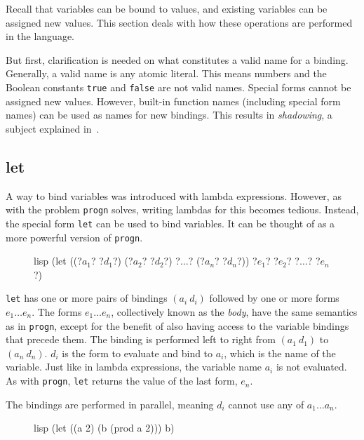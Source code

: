 Recall that variables can be bound to values, and existing variables can be assigned new values. This section deals with how these operations are performed in the language.

But first, clarification is needed on what constitutes a valid name for a binding. Generally, a valid name is any atomic literal. This means numbers and the Boolean constants \texttt{true} and \texttt{false} are not valid names. Special forms cannot be assigned new values. However, built-in function names (including special form names) can be used as names for new bindings. This results in \textit{shadowing}, a subject explained in~.

\subsection{let}
A way to bind variables was introduced with lambda expressions. However, as with the problem \texttt{progn} solves, writing lambdas for this becomes tedious. Instead, the special form \texttt{let} can be used to bind variables. It can be thought of as a more powerful version of \texttt{progn}.

\begin{figure}[htp]
    \centering
    \begin{cminted}[autogobble=true, escapeinside=??]{lisp}
        (let ((?$a_1$? ?$d_1$?) (?$a_2$? ?$d_2$?) ?$\ldots$? (?$a_n$? ?$d_n$?)) ?$e_1$? ?$e_2$? ?$\ldots$? ?$e_n$?)
    \end{cminted}
    \captionsetup[figure]{font=small}
\end{figure}

\texttt{let} has one or more pairs of bindings $(a_i\ d_i)$ followed by one or more forms $e_1 \ldots e_n$. The forms $e_1 \ldots e_n$, collectively known as the \textit{body}, have the same semantics as in \texttt{progn}, except for the benefit of also having access to the variable bindings that precede them. The binding is performed left to right from $(a_1\ d_1)$ to $(a_n\ d_n)$. $d_i$ is the form to evaluate and bind to $a_i$, which is the name of the variable. Just like in lambda expressions, the variable name $a_i$ is not evaluated. As with \texttt{progn}, \texttt{let} returns the value of the last form, $e_n$.

The bindings are performed in parallel, meaning $d_i$ cannot use any of $a_1 \ldots a_n$.

\begin{figure}[htp]
    \centering
    \begin{cminted}[autogobble=true]{lisp}
        (let ((a 2) (b (prod a 2))) b)
    \end{cminted}
    \captionsetup[figure]{font=small}
\end{figure}

